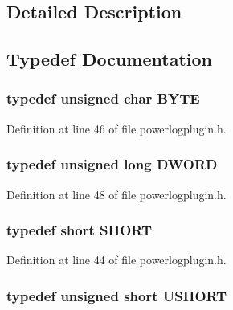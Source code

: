 \subsection{Detailed Description}


\subsection{Typedef Documentation}
\hypertarget{group__powerlogplugin_ga4ae1dab0fb4b072a66584546209e7d58}{
\subsubsection[{B\-Y\-T\-E}]{\setlength{\rightskip}{0pt plus 5cm}typedef unsigned char {\bf B\-Y\-T\-E}}}\label{group__powerlogplugin_ga4ae1dab0fb4b072a66584546209e7d58}


Definition at line 46 of file powerlogplugin.\-h.

\hypertarget{group__powerlogplugin_gad342ac907eb044443153a22f964bf0af}{
\subsubsection[{D\-W\-O\-R\-D}]{\setlength{\rightskip}{0pt plus 5cm}typedef unsigned {\bf long} {\bf D\-W\-O\-R\-D}}}\label{group__powerlogplugin_gad342ac907eb044443153a22f964bf0af}


Definition at line 48 of file powerlogplugin.\-h.

\hypertarget{group__powerlogplugin_ga9909bd3cf05f0906045f2ee85be4eeac}{
\subsubsection[{S\-H\-O\-R\-T}]{\setlength{\rightskip}{0pt plus 5cm}typedef short {\bf S\-H\-O\-R\-T}}}\label{group__powerlogplugin_ga9909bd3cf05f0906045f2ee85be4eeac}


Definition at line 44 of file powerlogplugin.\-h.

\hypertarget{group__powerlogplugin_ga5850d5316caf7f4cedd742fdf8cd7c02}{
\subsubsection[{U\-S\-H\-O\-R\-T}]{\setlength{\rightskip}{0pt plus 5cm}typedef unsigned short {\bf U\-S\-H\-O\-R\-T}}}\label{group__powerlogplugin_ga5850d5316caf7f4cedd742fdf8cd7c02}


